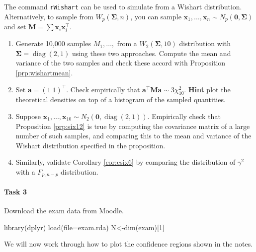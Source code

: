 \documentclass[
]{book}
\newenvironment{Shaded}{\begin{snugshade}}{\end{snugshade}}
\newcommand{\AttributeTok}[1]{\textcolor[rgb]{0.77,0.63,0.00}{#1}}
\newcommand{\DecValTok}[1]{\textcolor[rgb]{0.00,0.00,0.81}{#1}}
\newcommand{\FunctionTok}[1]{\textcolor[rgb]{0.00,0.00,0.00}{#1}}
\newcommand{\NormalTok}[1]{#1}
\newcommand{\OtherTok}[1]{\textcolor[rgb]{0.56,0.35,0.01}{#1}}
\newcommand{\StringTok}[1]{\textcolor[rgb]{0.31,0.60,0.02}{#1}}
\theoremstyle{definition}
\theoremstyle{definition}
\theoremstyle{definition}
\theoremstyle{definition}
\theoremstyle{remark}
\begin{document}
The command \texttt{rWishart} can be used to simulate from a Wishart distribution. Alternatively, to sample from \(W_p(\boldsymbol{\Sigma},n)\), you can sample \(\mathbf x_1, \ldots, \mathbf x_n \sim N_p(\boldsymbol 0, \boldsymbol{\Sigma})\) and set \(\mathbf M= \sum \mathbf x_i \mathbf x_i^\top\).

\begin{enumerate}
\def\labelenumi{\roman{enumi}.}
\item
  Generate 10,000 samples \(M_1, \ldots,\) from a \(W_2(\boldsymbol{\Sigma}, 10)\) distribution with \(\boldsymbol{\Sigma}= \operatorname{diag}(2,1)\) using these two approaches. Compute the mean and variance of the two samples and check these accord with Proposition \ref{prp:wishartmean}.
\item
  Set \(\mathbf a= (1\; 1)^\top\). Check empirically that \(\mathbf a^\top \mathbf M\mathbf a\sim 3 \chi^2_{10}\).
  \textbf{Hint} plot the theoretical densities on top of a histogram of the sampled quantities.
\item
  Suppose \(\mathbf x_1, \ldots, \mathbf x_{10} \sim N_2(\boldsymbol 0, \operatorname{diag}(2,1))\). Empirically check that Proposition \ref{prp:six12} is true by computing the covariance matrix of a large number of such samples, and comparing this to the mean and variance of the Wishart distribution specified in the proposition.
\item
  Similarly, validate Corollary \ref{cor:csix6} by comparing the distribution of \(\gamma^2\) with a \(F_{p, n-p}\) distribution.
\end{enumerate}

\hypertarget{task-3-2}{%
\paragraph*{Task 3}\label{task-3-2}}

Download the exam data from Moodle.

\begin{Shaded}
\begin{Highlighting}[]
\FunctionTok{library}\NormalTok{(dplyr)}
\FunctionTok{load}\NormalTok{(}\AttributeTok{file=}\StringTok{\textquotesingle{}exam.rda\textquotesingle{}}\NormalTok{)}
\NormalTok{N}\OtherTok{\textless{}{-}}\FunctionTok{dim}\NormalTok{(exam)[}\DecValTok{1}\NormalTok{]}
\end{Highlighting}
\end{Shaded}

We will now work through how to plot the confidence regions shown in the notes.
\end{document}
